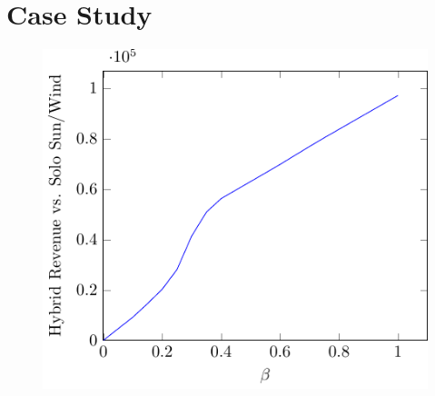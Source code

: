 \section{Case Study}



\begin{figure}[h!]
	\centering
	\includegraphics[scale=0.7]{Figures/figure.pdf}
\end{figure}